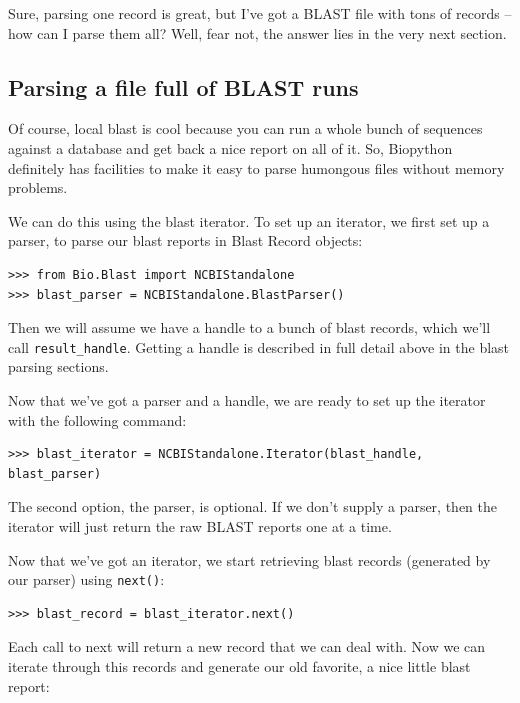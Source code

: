\documentclass{report}
\begin{document}
Sure, parsing one record is great, but I've got a BLAST file with tons of records -- how can I parse them all? Well, fear not, the answer lies in the very next section.

\subsection{Parsing a file full of BLAST runs}

Of course, local blast is cool because you can run a whole bunch of sequences against a database and get back a nice report on all of it. So, Biopython definitely has facilities to make it easy to parse humongous files without memory problems. 


We can do this using the blast iterator. To set up an iterator, we first set up a parser, to parse our blast reports in Blast Record objects:

\begin{verbatim}
>>> from Bio.Blast import NCBIStandalone
>>> blast_parser = NCBIStandalone.BlastParser()
\end{verbatim}

Then we will assume we have a handle to a bunch of blast records, which we'll call \verb|result_handle|. Getting a handle is described in full detail above in the blast parsing sections. 

Now that we've got a parser and a handle, we are ready to set up the iterator with the following command:

\begin{verbatim}
>>> blast_iterator = NCBIStandalone.Iterator(blast_handle, blast_parser)
\end{verbatim}

The second option, the parser, is optional. If we don't supply a parser, then the iterator will just return the raw BLAST reports one at a time.

Now that we've got an iterator, we start retrieving blast records (generated by our parser) using \verb|next()|:

\begin{verbatim}
>>> blast_record = blast_iterator.next()
\end{verbatim}

Each call to next will return a new record that we can deal with. Now we can iterate through this records and generate our old favorite, a nice little blast report:
\end{document}
